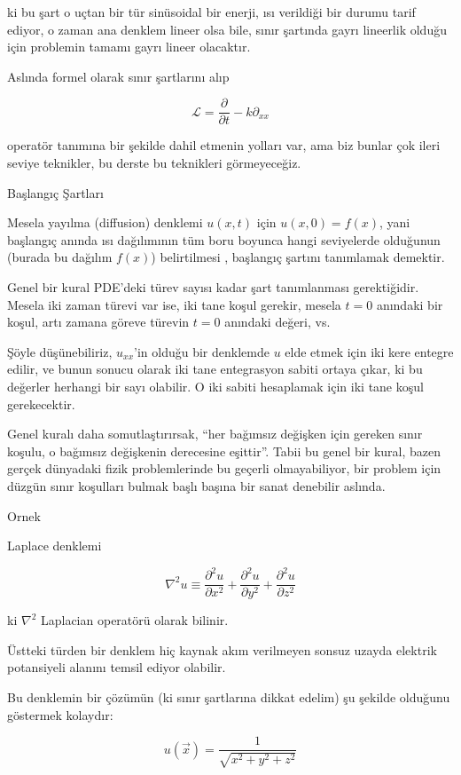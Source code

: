 \documentclass[12pt,fleqn]{article}\usepackage{../../common}
\begin{document}
ki bu şart o uçtan bir tür sinüsoidal bir enerji, ısı verildiği bir durumu
tarif ediyor, o zaman ana denklem lineer olsa bile, sınır şartında gayrı
lineerlik olduğu için problemin tamamı gayrı lineer olacaktır. 

Aslında formel olarak sınır şartlarını alıp 

$$ \mathcal{L}  = \frac{\partial }{\partial t} - k \partial_{xx}$$

operatör tanımına bir şekilde dahil etmenin yolları var, ama biz bunlar çok
ileri seviye teknikler, bu derste bu teknikleri görmeyeceğiz. 

Başlangıç Şartları

Mesela yayılma (diffusion) denklemi $u(x,t)$ için $u(x,0) = f(x)$, yani
başlangıç anında ısı dağılımının tüm boru boyunca hangi seviyelerde
olduğunun (burada bu dağılım $f(x)$) belirtilmesi , başlangıç şartını
tanımlamak demektir.

Genel bir kural PDE'deki türev sayısı kadar şart tanımlanması
gerektiğidir. Mesela iki zaman türevi var ise, iki tane koşul gerekir,
mesela $t=0$ anındaki bir koşul, artı zamana göreve türevin $t=0$ anındaki
değeri, vs. 

Şöyle düşünebiliriz, $u_{xx}$'in olduğu bir denklemde $u$ elde etmek için
iki kere entegre edilir, ve bunun sonucu olarak iki tane entegrasyon sabiti
ortaya çıkar, ki bu değerler herhangi bir sayı olabilir. O iki sabiti
hesaplamak için iki tane koşul gerekecektir. 

Genel kuralı daha somutlaştırırsak, ``her bağımsız değişken için gereken
sınır koşulu, o bağımsız değişkenin derecesine eşittir''. Tabii bu genel
bir kural, bazen gerçek dünyadaki fizik problemlerinde bu geçerli
olmayabiliyor, bir problem için düzgün sınır koşulları bulmak başlı başına
bir sanat denebilir aslında. 

Ornek

Laplace denklemi

$$ \nabla^2 u \equiv \frac{\partial ^2u}{\partial x^2} + 
\frac{\partial ^2u}{\partial y^2}  +
\frac{\partial ^2u}{\partial z^2} 
$$

ki $\nabla^2$ Laplacian operatörü olarak bilinir. 

Üstteki türden bir denklem hiç kaynak akım verilmeyen sonsuz uzayda
elektrik potansiyeli alanını temsil ediyor olabilir. 

Bu denklemin bir çözümün (ki sınır şartlarına dikkat edelim) şu şekilde
olduğunu göstermek kolaydır:

$$ u(\vec{x}) = \frac{1}{\sqrt{x^2+y^2+z^2}} $$
\end{document}
